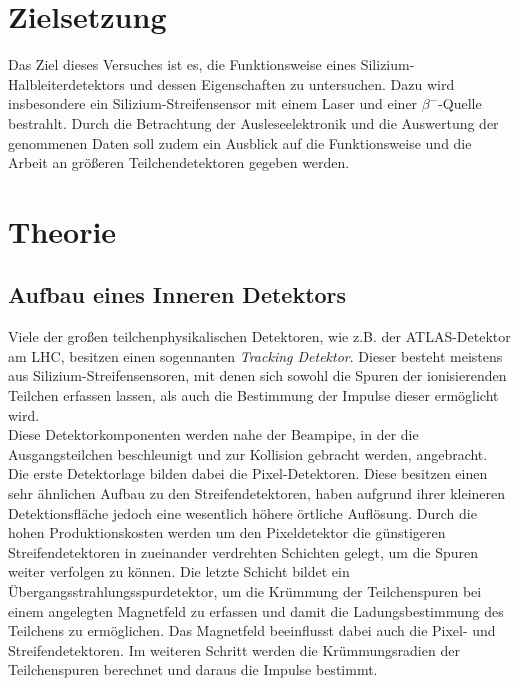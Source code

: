 \section{Zielsetzung}
\label{sec:Zielsetzung}

Das Ziel dieses Versuches ist es, die Funktionsweise eines Silizium-Halbleiterdetektors und dessen Eigenschaften zu untersuchen. Dazu wird insbesondere ein Silizium-Streifensensor mit einem Laser und einer $\beta^{-}$-Quelle bestrahlt. Durch die Betrachtung der Ausleseelektronik und die Auswertung der genommenen Daten soll zudem ein Ausblick auf die Funktionsweise und die Arbeit an größeren Teilchendetektoren gegeben werden.

\section{Theorie}
\label{sec:Theorie}
\subsection{Aufbau eines Inneren Detektors}

Viele der großen teilchenphysikalischen Detektoren, wie z.B. der ATLAS-Detektor am LHC, besitzen einen sogennanten \textit{Tracking Detektor}. Dieser besteht meistens aus Silizium-Streifensensoren, mit denen sich sowohl die Spuren der ionisierenden Teilchen erfassen lassen, als auch die Bestimmung der Impulse dieser ermöglicht wird.\\
Diese Detektorkomponenten werden nahe der Beampipe, in der die Ausgangsteilchen beschleunigt und zur Kollision gebracht werden, angebracht. Die erste Detektorlage bilden dabei die Pixel-Detektoren. Diese besitzen einen sehr ähnlichen Aufbau zu den Streifendetektoren, haben aufgrund ihrer kleineren Detektionsfläche jedoch eine wesentlich höhere örtliche Auflösung. Durch die hohen Produktionskosten werden um den Pixeldetektor die günstigeren Streifendetektoren in zueinander verdrehten Schichten gelegt, um die Spuren weiter verfolgen zu können. Die letzte Schicht bildet ein Übergangsstrahlungsspurdetektor, um die Krümmung der Teilchenspuren bei einem angelegten Magnetfeld zu erfassen und damit die Ladungsbestimmung des Teilchens zu ermöglichen. Das Magnetfeld beeinflusst dabei auch die Pixel- und Streifendetektoren. Im weiteren Schritt werden die Krümmungsradien der Teilchenspuren berechnet und daraus die Impulse bestimmt.

